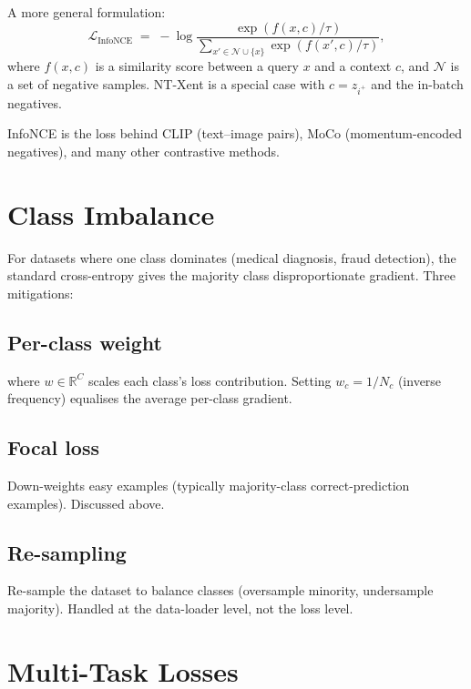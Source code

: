 A more general formulation:
\[
  \mathcal{L}_{\text{InfoNCE}}
  \;=\;
  -\log \frac{\exp(f(x, c) / \tau)}{\sum_{x' \in \mathcal{N} \cup \{x\}} \exp(f(x', c) / \tau)},
\]
where $f(x, c)$ is a similarity score between a query $x$ and
a context $c$, and $\mathcal{N}$ is a set of negative samples.
NT-Xent is a special case with $c = z_{i^+}$ and the in-batch
negatives.

InfoNCE is the loss behind CLIP (text--image pairs), MoCo
(momentum-encoded negatives), and many other contrastive
methods.

\section{Class Imbalance}
\label{sec:losses:class_imbalance}

For datasets where one class dominates (medical diagnosis,
fraud detection), the standard cross-entropy gives the majority
class disproportionate gradient. Three mitigations:

\subsection{Per-class weight}
\label{ssec:losses:class_weight}

 where $w \in \mathbb{R}^C$ scales
each class's loss contribution. Setting $w_c = 1 / N_c$
(inverse frequency) equalises the average per-class gradient.

\subsection{Focal loss}
\label{ssec:losses:focal_imbalance}

Down-weights easy examples (typically majority-class
correct-prediction examples). Discussed above.

\subsection{Re-sampling}
\label{ssec:losses:resampling}

Re-sample the dataset to balance classes (oversample minority,
undersample majority). Handled at the data-loader level, not the
loss level.

\section{Multi-Task Losses}
\label{sec:losses:multi_task}

